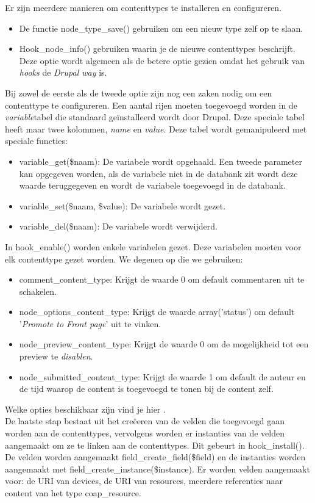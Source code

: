 \noindent
Er zijn meerdere manieren om contenttypes te installeren en configureren.
\begin{itemize}
\item De functie node\_type\_save() gebruiken om een nieuw type zelf op te slaan.
\item Hook\_node\_info() gebruiken waarin je de nieuwe contenttypes beschrijft. Deze optie wordt algemeen als de betere optie gezien omdat het gebruik van \textit{hooks} de\textit{ Drupal way} is.
\end{itemize}
Bij zowel de eerste als de tweede optie zijn nog een zaken nodig om een contenttype te configureren. Een aantal rijen moeten toegevoegd worden in de \textit{variable}tabel die standaard ge\"{i}nstalleerd wordt door Drupal. Deze speciale tabel heeft maar twee kolommen, \textit{name} en \textit{value}. Deze tabel wordt gemanipuleerd met speciale functies:
\begin{itemize}
\item variable\_get(\$naam): De variabele wordt opgehaald. Een tweede parameter kan opgegeven worden, als de variabele niet in de databank zit wordt deze waarde teruggegeven en wordt de variabele toegevoegd in de databank.
\item variable\_set(\$naam, \$value): De variabele wordt gezet.
\item variable\_del(\$naam): De variabele wordt verwijderd.
\end{itemize}

\noindent
In hook\_enable() worden enkele variabelen gezet. Deze variabelen moeten voor elk contenttype gezet worden. We degenen op die we gebruiken:
\begin{itemize}
\item comment\_content\_type: Krijgt de waarde 0 om default commentaren uit te schakelen.
\item node\_options\_content\_type: Krijgt de waarde array('status') om default '\textit{Promote to Front page}' uit te vinken.
\item node\_preview\_content\_type: Krijgt de waarde 0 om de mogelijkheid tot een preview te \textit{disablen}.
\item node\_submitted\_content\_type: Krijgt de waarde 1 om default de auteur en de tijd waarop de content is toegevoegd te tonen bij de content zelf.
\end{itemize}
Welke opties beschikbaar zijn vind je hier \cite{contentTypeVariables}.\\

\noindent
De laatste stap bestaat uit het cre\"{e}eren van de velden die toegevoegd gaan worden aan de contenttypes, vervolgens worden er instanties van de velden aangemaakt om ze te linken aan de contenttypes. Dit gebeurt in hook\_install(). De velden worden aangemaakt field\_create\_field(\$field) en de instanties worden aangemaakt met field\_create\_instance(\$instance). Er worden velden aangemaakt voor: de URI van devices, de URI van resources, meerdere referenties naar content van het type coap\_resource. %

